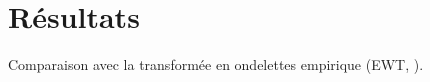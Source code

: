 \documentclass{gretsi}
\begin{document}

\section{Résultats} 

Comparaison avec la transformée en ondelettes empirique (EWT, \cite{gilles_13_EWT}).\\



 
{}
\end{document}
